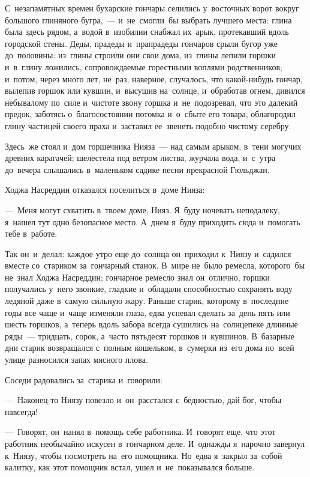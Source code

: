 \documentclass[12pt,a4paper]{book}
\begin{document}
С~незапамятных времен бухарские гончары селились у~восточных ворот вокруг большого глиняного бугра,~— и~не~смогли~бы выбрать лучшего места: глина была здесь рядом, а~водой в~изобилии снабжал их~арык, протекавший вдоль городской стены. Деды, прадеды и~прапрадеды гончаров срыли бугор уже до~половины: из~глины строили они свои дома, из~глины лепили горшки и~в~глину ложились, сопровождаемые горестными воплями родственников; и~потом, через много лет, не~раз, наверное, случалось, что какой-нибудь гончар, вылепив горшок или кувшин, и~высушив на~солнце, и~обработав огнем, дивился небывалому по~силе и~чистоте звону горшка и~не~подозревал, что это далекий предок, заботясь о~благосостоянии потомка и~о~сбыте его товара, облагородил глину частицей своего праха и~заставил ее~звенеть подобно чистому серебру.

Здесь~же стоял и~дом горшечника Нияза~— над самым арыком, в~тени могучих древних карагачей; шелестела под ветром листва, журчала вода, и~с~утра до~вечера слышались в~маленьком садике песни прекрасной Гюльджан.

Ходжа Насреддин отказался поселиться в~доме Нияза:

—~Меня могут схватить в~твоем доме, Нияз. Я~буду ночевать неподалеку, я~нашел тут одно безопасное место. А~днем я~буду приходить сюда и~помогать тебе в~работе.

Так он~и~делал: каждое утро еще до~солнца он~приходил к~Ниязу и~садился вместе со~стариком за~гончарный станок. В~мире не~было ремесла, которого~бы не~знал Ходжа Насреддин; гончарное ремесло знал он~отлично, горшки получались у~него звонкие, гладкие и~обладали способностью сохранять воду ледяной даже в~самую сильную жару. Раньше старик, которому в~последние годы все чаще и~чаще изменяли глаза, едва успевал сделать за~день пять или шесть горшков, а~теперь вдоль забора всегда сушились на~солнцепеке длинные ряды~— тридцать, сорок, а~часто пятьдесят горшков и~кувшинов. В~базарные дни старик возвращался с~полным кошельком, в~сумерки из~его дома по~всей улице разносился запах мясного плова.

Соседи радовались за~старика и~говорили:

—~Наконец-то Ниязу повезло и~он~расстался с~бедностью, дай бог, чтобы навсегда!

—~Говорят, он~нанял в~помощь себе работника. И~говорят еще, что этот работник необычайно искусен в~гончарном деле. И~однажды я~нарочно завернул к~Ниязу, чтобы посмотреть на~его помощника. Но~едва я~закрыл за~собой калитку, как этот помощник встал, ушел и~не~показывался больше.
\end{document}
